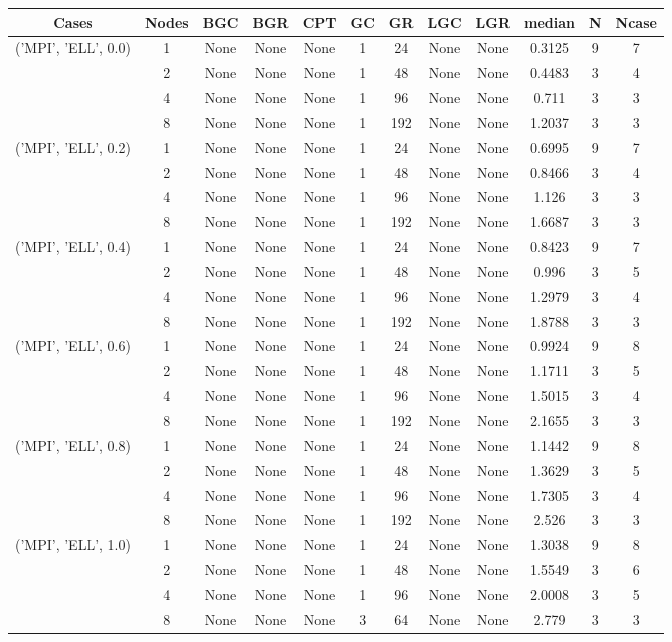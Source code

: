 \begin{tabular}{cccccccccccc}
\hline
Cases & Nodes& BGC& BGR& CPT& GC& GR& LGC& LGR& median & N & Ncase \\
\hline
\multirow{4}{*}{('MPI', 'ELL', 0.0)}& 1& None& None& None& 1& 24& None& None& 0.3125& 9& 7\\
& 2& None& None& None& 1& 48& None& None& 0.4483& 3& 4\\
& 4& None& None& None& 1& 96& None& None& 0.711& 3& 3\\
& 8& None& None& None& 1& 192& None& None& 1.2037& 3& 3\\
\hline
\multirow{4}{*}{('MPI', 'ELL', 0.2)}& 1& None& None& None& 1& 24& None& None& 0.6995& 9& 7\\
& 2& None& None& None& 1& 48& None& None& 0.8466& 3& 4\\
& 4& None& None& None& 1& 96& None& None& 1.126& 3& 3\\
& 8& None& None& None& 1& 192& None& None& 1.6687& 3& 3\\
\hline
\multirow{4}{*}{('MPI', 'ELL', 0.4)}& 1& None& None& None& 1& 24& None& None& 0.8423& 9& 7\\
& 2& None& None& None& 1& 48& None& None& 0.996& 3& 5\\
& 4& None& None& None& 1& 96& None& None& 1.2979& 3& 4\\
& 8& None& None& None& 1& 192& None& None& 1.8788& 3& 3\\
\hline
\multirow{4}{*}{('MPI', 'ELL', 0.6)}& 1& None& None& None& 1& 24& None& None& 0.9924& 9& 8\\
& 2& None& None& None& 1& 48& None& None& 1.1711& 3& 5\\
& 4& None& None& None& 1& 96& None& None& 1.5015& 3& 4\\
& 8& None& None& None& 1& 192& None& None& 2.1655& 3& 3\\
\hline
\multirow{4}{*}{('MPI', 'ELL', 0.8)}& 1& None& None& None& 1& 24& None& None& 1.1442& 9& 8\\
& 2& None& None& None& 1& 48& None& None& 1.3629& 3& 5\\
& 4& None& None& None& 1& 96& None& None& 1.7305& 3& 4\\
& 8& None& None& None& 1& 192& None& None& 2.526& 3& 3\\
\hline
\multirow{4}{*}{('MPI', 'ELL', 1.0)}& 1& None& None& None& 1& 24& None& None& 1.3038& 9& 8\\
& 2& None& None& None& 1& 48& None& None& 1.5549& 3& 6\\
& 4& None& None& None& 1& 96& None& None& 2.0008& 3& 5\\
& 8& None& None& None& 3& 64& None& None& 2.779& 3& 3\\
\hline
\end{tabular}
